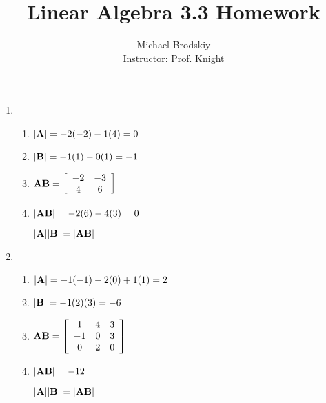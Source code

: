 \documentclass[12pt]{article}
\title{Linear Algebra 3.3 Homework}
\date{}
\author{Michael Brodskiy\\ \small Instructor: Prof. Knight}
\begin{document}
\maketitle

\begin{enumerate}

  \item

    \begin{enumerate}

      \item $|\bold{A}|=-2(-2)-1(4)=0$

      \item $|\bold{B}|=-1(1)-0(1)=-1$

      \item $\bold{AB}=\left[ \begin{array}{cc} -2 & -3\\ 4 & 6  \end{array} \right]$

      \item $|\bold{AB}|=-2(6)-4(3)=0$

        \begin{center}
          $|\bold{A}||\bold{B}|=|\bold{AB}|$ \checkmark 
        \end{center}

    \end{enumerate}

    \setcounter{enumi}{2}

  \item

    \begin{enumerate}

      \item $|\bold{A}|=-1(-1)-2(0)+1(1)=2$

      \item $|\bold{B}|=-1(2)(3)=-6$

      \item $\bold{AB}=\left[ \begin{array}{ccc} 1 & 4 & 3\\ -1 & 0 & 3\\ 0 & 2 & 0  \end{array} \right]$

      \item $|\bold{AB}|=-12$

        \begin{center}
          $|\bold{A}||\bold{B}|=|\bold{AB}|$ \checkmark 
        \end{center}


\end{enumerate}
\end{enumerate}
\end{document}
